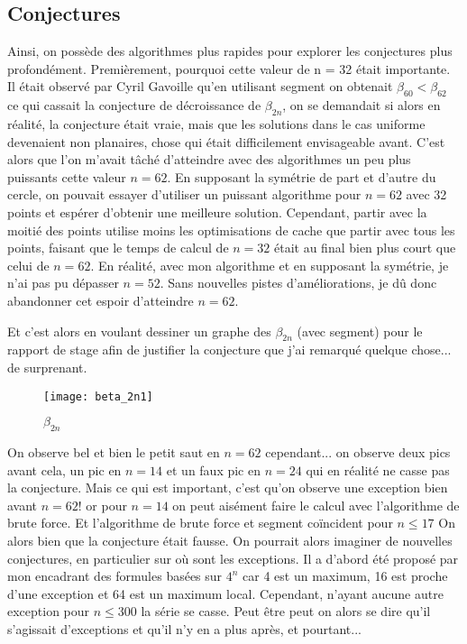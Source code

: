 \subsection{Conjectures}

Ainsi, on possède des algorithmes plus rapides pour explorer les conjectures plus profondément. Premièrement, pourquoi cette valeur de n = 32 était importante. Il était observé par Cyril Gavoille qu'en utilisant segment on obtenait $\beta_{60} < \beta_{62}$ ce qui cassait la conjecture de décroissance de $\beta_{2n}$, on se demandait si alors en réalité, la conjecture était vraie, mais que les solutions dans le cas uniforme devenaient non planaires, chose qui était difficilement envisageable avant. C'est alors que l'on m'avait tâché d'atteindre avec des algorithmes un peu plus puissants cette valeur $n = 62$. En supposant la symétrie de part et d'autre du cercle, on pouvait essayer d'utiliser un puissant algorithme pour $n = 62$ avec 32 points et espérer d'obtenir une meilleure solution. Cependant, partir avec la moitié des points utilise moins les optimisations de cache que partir avec tous les points, faisant que le temps de calcul de $n = 32$ était au final bien plus court que celui de $n = 62$. En réalité, avec mon algorithme et en supposant la symétrie, je n'ai pas pu dépasser $n = 52$. Sans nouvelles pistes d'améliorations, je dû donc abandonner cet espoir d'atteindre $n = 62$.

Et c'est alors en voulant dessiner un graphe des $\beta_{2n}$ (avec segment) pour le rapport de stage afin de justifier la conjecture que j'ai remarqué quelque chose... de surprenant.

\begin{figure}[h!]
  \centering
  \texttt{[image: beta\_2n1]}
  \caption{$\beta_{2n}$}
  \label{fig:beta2n1}
\end{figure}

On observe bel et bien le petit saut en $n = 62$
cependant... on observe deux pics avant cela, un pic en $n = 14$ et un faux pic en $n = 24$ qui en réalité ne casse pas la conjecture. Mais ce qui est important, c'est qu'on observe une exception bien avant $n = 62$! or pour $n = 14$ on peut aisément faire le calcul avec l'algorithme de brute force. Et l'algorithme de brute force et segment coïncident pour $n \leq 17$
On alors bien que la conjecture était fausse. On pourrait alors imaginer de nouvelles conjectures, en particulier sur où sont les exceptions. Il a d'abord été proposé par mon encadrant des formules basées sur $4^n$ car 4 est un maximum, 16 est proche d'une exception et 64 est un maximum local. Cependant, n'ayant aucune autre exception pour $n \leq 300$ la série se casse. Peut être peut on alors se dire qu'il s'agissait d'exceptions et qu'il n'y en a plus après, et pourtant...

